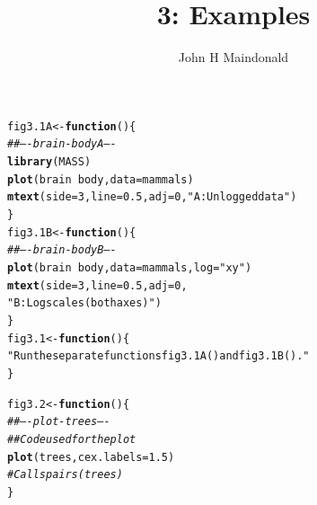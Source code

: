 \documentclass[12pt, a4paper,  BCOR=8.25mm, DIV=15]{scrartcl}\usepackage[]{graphicx}\usepackage[]{color}
\makeatletter
\newcommand{\hlnum}[1]{\textcolor[rgb]{0.686,0.059,0.569}{#1}}%
\newcommand{\hlstr}[1]{\textcolor[rgb]{0.192,0.494,0.8}{#1}}%
\newcommand{\hlcom}[1]{\textcolor[rgb]{0.678,0.584,0.686}{\textit{#1}}}%
\newcommand{\hlopt}[1]{\textcolor[rgb]{0,0,0}{#1}}%
\newcommand{\hlstd}[1]{\textcolor[rgb]{0.345,0.345,0.345}{#1}}%
\newcommand{\hlkwa}[1]{\textcolor[rgb]{0.161,0.373,0.58}{\textbf{#1}}}%
\newcommand{\hlkwb}[1]{\textcolor[rgb]{0.69,0.353,0.396}{#1}}%
\newcommand{\hlkwc}[1]{\textcolor[rgb]{0.333,0.667,0.333}{#1}}%
\newcommand{\hlkwd}[1]{\textcolor[rgb]{0.737,0.353,0.396}{\textbf{#1}}}%
\newenvironment{kframe}{%
 \def\at@end@of@kframe{}%
 \ifinner\ifhmode%
  \def\at@end@of@kframe{\end{minipage}}%
  \begin{minipage}{\columnwidth}%
 \fi\fi%
 \def\FrameCommand##1{\hskip\@totalleftmargin \hskip-\fboxsep
 \colorbox{shadecolor}{##1}\hskip-\fboxsep
     \hskip-\linewidth \hskip-\@totalleftmargin \hskip\columnwidth}%
 \MakeFramed {\advance\hsize-\width
   \@totalleftmargin\z@ \linewidth\hsize
   \@setminipage}}%
 {\par\unskip\endMakeFramed%
 \at@end@of@kframe}
\newenvironment{knitrout}{}{} %
\makeatother
\begin{document}



\title{3: Examples}
\author{John H Maindonald}
\maketitle

\begin{knitrout}
\color{fgcolor}\begin{kframe}
\begin{alltt}
\hlstd{fig3.1A} \hlkwb{<-} \hlkwa{function}\hlstd{()\{}
\hlcom{## ---- brain-bodyA ----}
\hlkwd{library}\hlstd{(MASS)}
\hlkwd{plot}\hlstd{(brain} \hlopt{~} \hlstd{body,} \hlkwc{data}\hlstd{=mammals)}
\hlkwd{mtext}\hlstd{(}\hlkwc{side}\hlstd{=}\hlnum{3}\hlstd{,} \hlkwc{line}\hlstd{=}\hlnum{0.5}\hlstd{,} \hlkwc{adj}\hlstd{=}\hlnum{0}\hlstd{,} \hlstr{"A: Unlogged data"}\hlstd{)}
\hlstd{\}}
\hlstd{fig3.1B} \hlkwb{<-} \hlkwa{function}\hlstd{()\{}
\hlcom{## ---- brain-bodyB ----}
\hlkwd{plot}\hlstd{(brain} \hlopt{~} \hlstd{body,} \hlkwc{data}\hlstd{=mammals,} \hlkwc{log}\hlstd{=}\hlstr{"xy"}\hlstd{)}
\hlkwd{mtext}\hlstd{(}\hlkwc{side}\hlstd{=}\hlnum{3}\hlstd{,} \hlkwc{line}\hlstd{=}\hlnum{0.5}\hlstd{,} \hlkwc{adj}\hlstd{=}\hlnum{0}\hlstd{,}
      \hlstr{"B: Log scales (both axes)"}\hlstd{)}
\hlstd{\}}
\hlstd{fig3.1} \hlkwb{<-} \hlkwa{function}\hlstd{()\{}
\hlstr{"Run the separate functions fig3.1A() and fig3.1B()."}
\hlstd{\}}
\end{alltt}
\end{kframe}
\end{knitrout}

\begin{knitrout}
\color{fgcolor}\begin{kframe}
\begin{alltt}
\hlstd{fig3.2} \hlkwb{<-} \hlkwa{function}\hlstd{()\{}
\hlcom{## ---- plot-trees ----}
\hlcom{## Code used for the plot}
\hlkwd{plot}\hlstd{(trees,} \hlkwc{cex.labels}\hlstd{=}\hlnum{1.5}\hlstd{)}
  \hlcom{# Calls pairs(trees)}
\hlstd{\}}
\end{alltt}
\end{kframe}
\end{knitrout}
\end{document}
